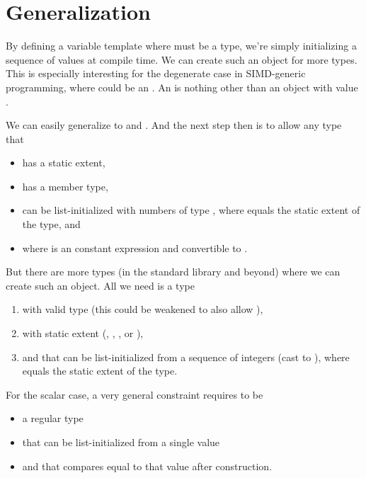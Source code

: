 \section{Generalization}
By defining a variable template \std{} where  must
be a \simd type, we're simply initializing a sequence of values at compile time.
We can create such an object for more types.
This is especially interesting for the degenerate case in SIMD-generic
programming, where  could \eg be an .
An \std{} is nothing other than an object  with value
.

We can easily generalize to \std{} and
\std{}.
And the next step then is to allow any type that
\begin{itemize}
  \item has a static extent,
  \item has a  member type,
  \item can be list-initialized with  numbers of type
    , where  equals the static extent of the type, and
  \item where  is an constant expression and convertible to .
\end{itemize}

But there are more types (in the standard library and beyond) where we can
create such an object.
All we need is a type
\begin{enumerate}
  \item with valid  type (this could be weakened
    to also allow ),
  \item with static extent (, ,
    , or ),
  \item and that can be list-initialized from a sequence of 
    integers (cast to ), where  equals
    the static extent of the type.
\end{enumerate}
For the scalar case, a very general constraint requires  to be
\begin{itemize}
  \item a regular type
  \item that can be list-initialized from a single value
  \item and that compares equal to that value after construction.
\end{itemize}

